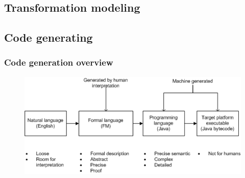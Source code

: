 \subsection{Transformation modeling}



\subsection{Code generating}


%
%
\frame
{
  \frametitle{Code generation overview}

\begin{center}

\begin{figure}

\includegraphics[width=\textwidth]{images/codegenneration.png}

\end{figure}

\end{center}
}
